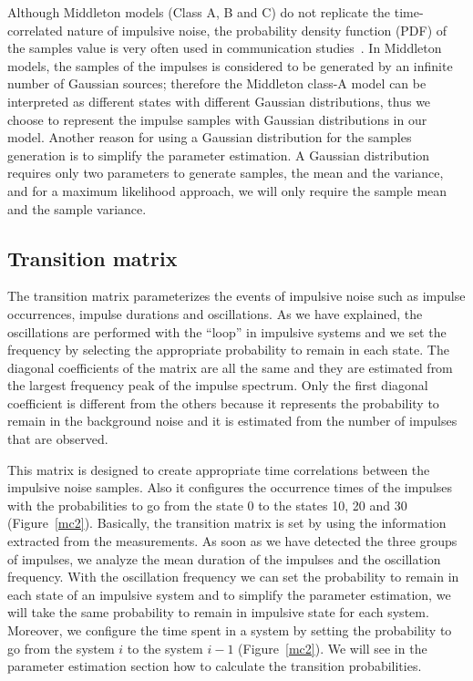 \documentclass[journal]{IEEEtran}
\begin{document}
Although Middleton models (Class A, B and C) do not replicate the time-correlated nature of impulsive noise, the probability density function (PDF) of the samples value is very often used in communication studies~\cite{midd1,midd2,midd3}. In Middleton models, the samples of the impulses is considered to be generated by an infinite number of Gaussian sources; therefore the Middleton class-A model can be interpreted as different states with different Gaussian distributions, thus we choose to represent the impulse samples with Gaussian distributions in our model. Another reason for using a Gaussian distribution for the samples generation is to simplify the parameter estimation. A Gaussian distribution requires only two parameters to generate samples, the mean and the variance, and for a maximum likelihood approach, we will only require the sample mean and the sample variance.
\subsection{Transition matrix}
The transition matrix parameterizes the events of impulsive noise such as impulse occurrences, impulse durations and oscillations. As we have explained, the oscillations are performed with the ``loop'' in impulsive systems and we set the frequency by selecting the appropriate probability to remain in each state. The diagonal coefficients of the matrix are all the same and they are estimated from the largest frequency peak of the impulse spectrum. Only the first diagonal coefficient is different from the others because it represents the probability to remain in the background noise and it is estimated from the number of impulses that are observed.\

This matrix is designed to create appropriate time correlations between the impulsive noise samples. Also it configures the occurrence times of the impulses with the probabilities to go from the state 0 to the states 10, 20 and 30 (Figure~\ref{mc2}). Basically, the transition matrix is set by using the information extracted from the measurements. As soon as we have detected the three groups of impulses, we analyze the mean duration of the impulses and the oscillation frequency. With the oscillation frequency we can set the probability to remain in each state of an impulsive system and to simplify the parameter estimation, we will take the same probability to remain in impulsive state for each system. Moreover, we configure the time spent in a system by setting the probability to go from the system $i$ to the system $i-1$ (Figure~\ref{mc2}). We will see in the parameter estimation section how to calculate the transition probabilities.
\end{document}
